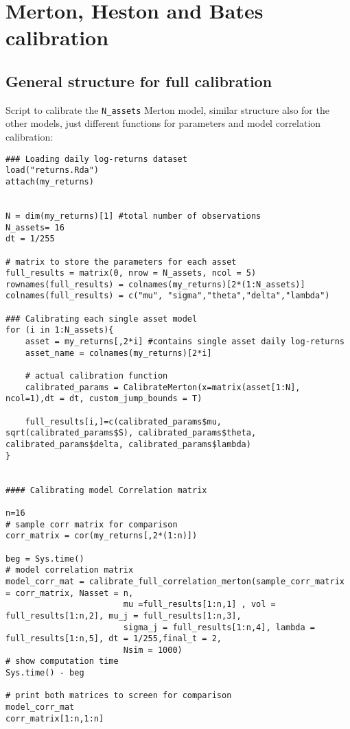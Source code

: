 \section{Merton, Heston and Bates  calibration}

\subsection{General structure for full calibration}
\bigskip
\noindent
Script to calibrate the \texttt{N\_assets} Merton model, similar structure also for the other models, just different functions for parameters  and model correlation calibration:
\begin{lstlisting}
### Loading daily log-returns dataset
load("returns.Rda")
attach(my_returns)


N = dim(my_returns)[1] #total number of observations
N_assets= 16
dt = 1/255

# matrix to store the parameters for each asset
full_results = matrix(0, nrow = N_assets, ncol = 5) 
rownames(full_results) = colnames(my_returns)[2*(1:N_assets)]
colnames(full_results) = c("mu", "sigma","theta","delta","lambda")

### Calibrating each single asset model
for (i in 1:N_assets){
	asset = my_returns[,2*i] #contains single asset daily log-returns
	asset_name = colnames(my_returns)[2*i]
	
	# actual calibration function
	calibrated_params = CalibrateMerton(x=matrix(asset[1:N], ncol=1),dt = dt, custom_jump_bounds = T)
	
	full_results[i,]=c(calibrated_params$mu, sqrt(calibrated_params$S), calibrated_params$theta, calibrated_params$delta, calibrated_params$lambda)
}


#### Calibrating model Correlation matrix

n=16
# sample corr matrix for comparison
corr_matrix = cor(my_returns[,2*(1:n)])

beg = Sys.time()
# model correlation matrix
model_corr_mat = calibrate_full_correlation_merton(sample_corr_matrix = corr_matrix, Nasset = n, 
						mu =full_results[1:n,1] , vol = full_results[1:n,2], mu_j = full_results[1:n,3], 
						sigma_j = full_results[1:n,4], lambda = full_results[1:n,5], dt = 1/255,final_t = 2, 
						Nsim = 1000)
# show computation time
Sys.time() - beg

# print both matrices to screen for comparison
model_corr_mat
corr_matrix[1:n,1:n]
\end{lstlisting}


